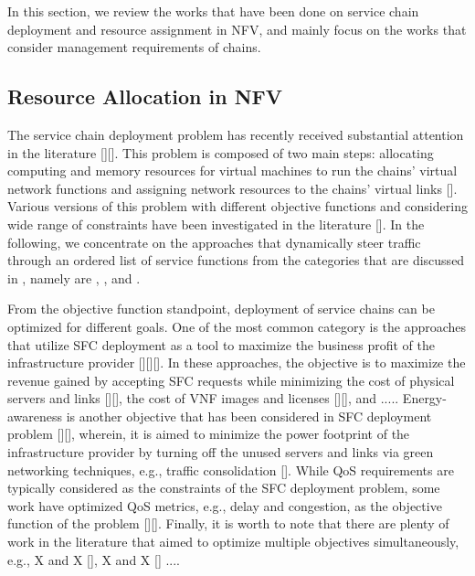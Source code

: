 In this section, we review the works that have been done on service chain deployment and resource assignment in NFV, and mainly focus on the works that consider management requirements of chains.

\subsection{Resource Allocation in NFV}
The service chain deployment problem has recently received substantial attention in the literature \cite{GilHerrera2016}[][].
This problem is composed of two main steps: allocating computing and memory resources for virtual machines to run the chains' virtual network functions and assigning network resources to the chains' virtual links [].
Various versions of this problem with different objective functions and considering wide range of constraints have been investigated in the literature [].
In the following, we concentrate on the approaches that dynamically steer traffic through an ordered list of service functions from the categories that are discussed in \cite{Laghrissi2019},
namely are , , and .

From the objective function standpoint, deployment of service chains can be optimized for different goals.
One of the most common category is the approaches that utilize SFC deployment as a tool to maximize the business profit of the infrastructure provider [][][].
In these approaches, the objective is to maximize the revenue gained by accepting SFC requests while minimizing the cost of physical servers and links [][], the cost of VNF images and licenses [][], and ..... Energy-awareness is another objective that has been considered in SFC deployment problem [][], wherein, it is aimed to minimize the power footprint of the infrastructure provider by turning off the unused servers and links via green networking techniques, e.g., traffic consolidation  []. While QoS requirements are typically considered as the constraints of the SFC deployment problem, some work have optimized QoS metrics, e.g., delay and congestion, as the objective function of the problem  [][]. Finally, it is worth to note that there are plenty of work in the literature that aimed to optimize multiple objectives simultaneously, e.g., X and X  [], X and X  [] ....


